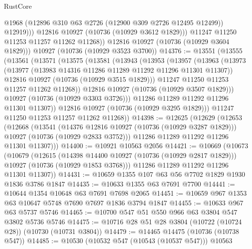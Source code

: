 \begin{lexlean}{RustCore}
\begin{coremodule}
                  @1968
                  (@12896 @310 @63 @2726 (@12900 @309 @2726 @12495 @12499))
                  @12919)))
            @12816
            @10927
            (@10736 (@10929 @3612 @1829)))
          @11247
          @11250
          @11253
          @11257
          @11262
          @11268))
      @12816
      @10927
      (@10736 (@10929 @3604 @1829)))
    @10927
    (@10736 (@10929 @3523 @3700))
@14376 := @13551
    (@13555
      (@13561
        (@13571
          (@13575
            (@13581
              (@13943
                (@13953
                  (@13957
                    (@13963
                      (@13973
                        (@13977 (@13983 @14316 @11286 @11289 @11292 @11296 @11301 @11307))
                        @12816
                        @10927
                        (@10736 (@10929 @3515 @1829)))
                      @11247
                      @11250
                      @11253
                      @11257
                      @11262
                      @11268))
                  @12816
                  @10927
                  (@10736 (@10929 @3507 @1829)))
                @10927
                (@10736 (@10929 @3303 @3726)))
              @11286
              @11289
              @11292
              @11296
              @11301
              @11307))
          @12816
          @10927
          (@10736 (@10929 @3295 @1829)))
        @11247
        @11250
        @11253
        @11257
        @11262
        @11268))
@14398 := @12625
    (@12629
      (@12653
        (@12668
          (@13541
            (@14376 @12816 @10927 (@10736 (@10929 @3287 @1829)))
            @10927
            (@10736 (@10929 @2833 @3752)))
          @11286
          @11289
          @11292
          @11296
          @11301
          @11307)))
@14400 := @10921 @10563 @2056
@14421 := @10669
    (@10673
      (@10679
        (@12615
          (@14398 @14400 @10927 (@10736 (@10929 @2817 @1829)))
          @10927
          (@10736 (@10929 @1853 @3768)))
        @11286
        @11289
        @11292
        @11296
        @11301
        @11307))
@14431 := @10659 @1355 @107 @63 @56 @7702 @1829 @1930 @1836 @3786 @1847
@14435 := @10633 @1355 @63 @7691 @7700
@14441 := @10644 @1354 @10648 @63 @7691 @7698 @2065
@14451 := @10659 @967 @1353 @63 @10647 @5748 @7690 @7697 @1836 @3794 @1847
@14455 := @10633 @967 @63 @5737 @5746
@14465 := @10700 @547 @51 @550 @966 @63 @3804 @547 @3802 @5736 @5746
@14475 := @10716 @28 @51 @28 @3804 (@10722 (@10724 @28)) (@10730 (@10731 @3804))
@14479 := @14465 @14475 (@10736 (@10738 @547))
@14485 := @10530 (@10532 @547 (@10543 (@10537 @547))) @10563

\end{coremodule}
\end{lexlean}
